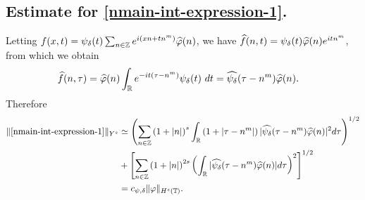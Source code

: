 %
%
%
%
%
%
%
%
\subsection{Estimate for
\texorpdfstring{\eqref{nmain-int-expression-1}}{Expression 1}.}
%
%
Letting $f(x,t) = \psi_{\delta}(t) \sum_{n \in \mathbb{Z}} e^{i(xn + tn^{m})} 
\widehat{\varphi}(n)$, we have $\widehat{f}(n,t) = \psi_{\delta}(t) \widehat{\varphi}(n) e^{itn^{m}}$,
from which we obtain
%
%
\begin{equation}
	\label{nfourier-trans-calc}
	\begin{split}
		\widehat{f}(n, \tau)
		& = \widehat{\varphi}(n) \int_{\mathbb{R}} e^{-it( \tau - n^{m})} 
		\psi_{\delta}(t) \ d t
    = \widehat{\psi_{\delta}}(\tau - n^{m}) \widehat{\varphi}(n).
	\end{split}
\end{equation}
%
%
%
%
%
%
Therefore
%
\begin{equation}
	\begin{split}
	\label{nmain-int1-est}
		\|\eqref{nmain-int-expression-1}\|_{Y^s}
		& \simeq \left (  \sum_{n\in \mathbb{Z}} \left (1 + |n| \right )^s \int_{\mathbb{R}} \left( 1 + | \tau - n^{m} 
		| \right )
    | \widehat{\psi_{\delta}}(\tau - n^{m}) \widehat{\varphi}(n) |^2 d \tau \right)^{1/2} 
		\\
		& + \left[ \sum_{n \in \mathbb{Z} }\left( 1 + | n | \right)^{2s} \left( \int_{\mathbb{R}} |
    \widehat{\psi_{\delta}}(\tau - n^{m})\widehat{\varphi}(n) | d \tau
		\right)^{2} \right]^{1/2}
		\\
    & = c_{\psi, \delta}
		\|\varphi\|_{H^s(\mathbb{T})}.
	\end{split}
\end{equation}
%
%
%
%
